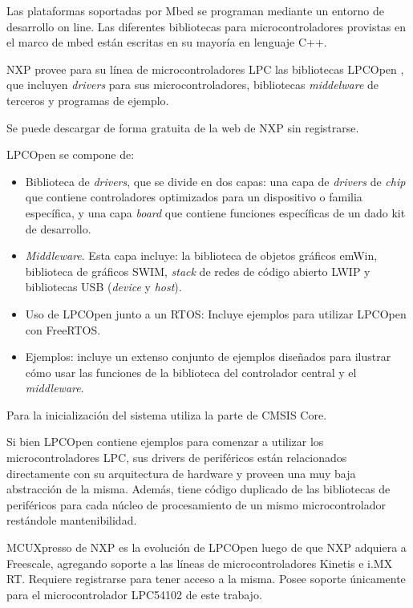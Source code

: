 Las plataformas soportadas por Mbed se programan mediante un entorno de desarrollo on line. Las diferentes bibliotecas para microcontroladores provistas en el marco de mbed están escritas en su mayoría en lenguaje C++.


NXP provee para su línea de microcontroladores LPC las bibliotecas LPCOpen \citep{LPCOpenNXP}, que incluyen \emph{drivers} para sus microcontroladores, bibliotecas \emph{middelware} de terceros y programas de ejemplo. 

Se puede descargar de forma gratuita de la web de NXP sin registrarse.

LPCOpen se compone de:

\begin{itemize}
\item
Biblioteca de \emph{drivers}, que se divide en dos capas: una capa de \emph{drivers} de \emph{chip} que contiene controladores optimizados para un dispositivo o familia específica, y una capa \emph{board} que contiene funciones específicas de un dado kit de desarrollo.
\item
\emph{Middleware}. Esta capa incluye: la biblioteca de objetos gráficos emWin, biblioteca de gráficos SWIM, \emph{stack} de redes de código abierto LWIP y bibliotecas USB (\emph{device} y \emph{host}).
\item
Uso de LPCOpen junto a un RTOS: Incluye ejemplos para utilizar LPCOpen con FreeRTOS.
\item
Ejemplos: incluye un extenso conjunto de ejemplos diseñados para ilustrar cómo usar las funciones de la biblioteca del controlador central y el \emph{middleware}.
\end{itemize}

Para la inicialización del sistema utiliza la parte de CMSIS Core.

Si bien LPCOpen contiene ejemplos para comenzar a utilizar los microcontroladores LPC, sus drivers de periféricos están relacionados directamente con su arquitectura de hardware y proveen una muy baja abstracción de la misma. Además, tiene código duplicado de las bibliotecas de periféricos para cada núcleo de procesamiento de un mismo microcontrolador restándole mantenibilidad.

MCUXpresso \citep{MCUXpresso} de NXP es la evolución de LPCOpen luego de que NXP adquiera a Freescale,  agregando soporte a las líneas de microcontroladores Kinetis e i.MX RT. Requiere registrarse para tener acceso a la misma. Posee soporte únicamente para el microcontrolador LPC54102 de este trabajo.

